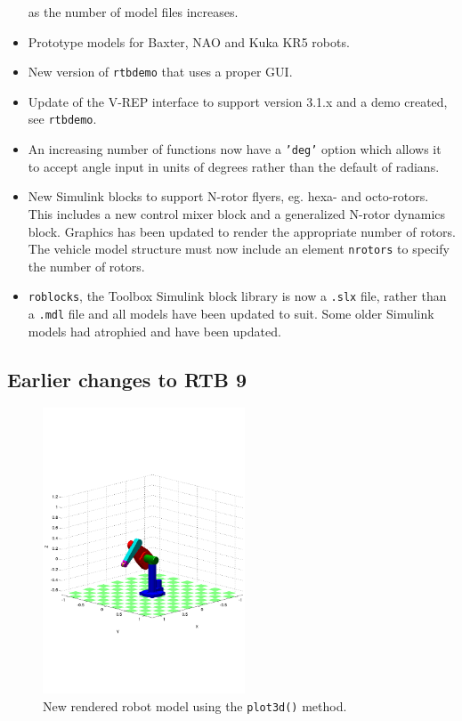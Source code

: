 \documentclass[a4paper]{report}
\begin{document}
\begin{itemize}
as the number of model files increases.
\item Prototype models for Baxter, NAO and Kuka KR5 robots.
\item New version of \texttt{rtbdemo} that uses a proper GUI.
\item Update of the V-REP interface to support version 3.1.x and a demo created, see \texttt{rtbdemo}.
\item An increasing number of functions now have a \texttt{'deg'} option which allows it to accept angle input in units of degrees rather than the default of
radians.
\item New Simulink blocks to support N-rotor flyers, eg. hexa- and octo-rotors.  This includes a new control mixer block and a generalized
N-rotor dynamics block.  Graphics has been updated to render the appropriate number of rotors.  The vehicle model structure must now include
an element \texttt{nrotors} to specify the number of rotors.
\item \texttt{roblocks}, the Toolbox Simulink block library is now a \texttt{.slx} file, rather than a \texttt{.mdl} file and all models have been updated
to suit.   Some older Simulink models had atrophied and have been updated.

\end{itemize}

\subsection{Earlier changes to RTB 9}

\begin{figure}[b]
\centering
\includegraphics[width=6cm]{figs/plot3d.pdf}
\caption{New rendered robot model using the \texttt{plot3d()} method.}\label{fig:plot3d}
\end{figure}
\end{document}

